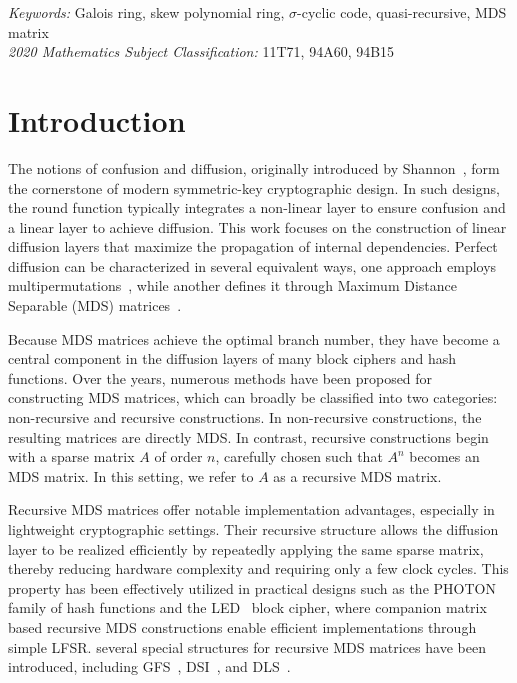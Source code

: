 \documentclass[11pt]{article}
\begin{document}
\noindent\textit{Keywords: }{Galois ring, skew polynomial ring, $\sigma$-cyclic code, quasi-recursive, MDS matrix}   \\
\textit{2020 Mathematics Subject Classification: }{11T71, 94A60, 94B15} 



\section{Introduction}
The notions of confusion and diffusion, originally introduced by Shannon~\cite{1949ShannonCommunication}, form the cornerstone of modern symmetric-key cryptographic design. In such designs, the round function typically integrates a non-linear layer to ensure confusion and a linear layer to achieve diffusion. This work focuses on the construction of linear diffusion layers that maximize the propagation of internal dependencies. Perfect diffusion can be characterized in several equivalent ways, one approach employs multipermutations~\cite{Vaudenay1995on}, while another defines it through Maximum Distance Separable (MDS) matrices~\cite{Daemen2002the}.

Because MDS matrices achieve the optimal branch number, they have become a central component in the diffusion layers of many block ciphers and hash functions. Over the years, numerous methods have been proposed for constructing MDS matrices, which can broadly be classified into two categories: non-recursive and recursive constructions. In non-recursive constructions, the resulting matrices are directly MDS. In contrast, recursive constructions begin with a sparse matrix $A$ of order $n$, carefully chosen such that $A^n$ becomes an MDS matrix. In this setting, we refer to $A$ as a recursive MDS matrix.

Recursive MDS matrices offer notable implementation advantages, especially in lightweight cryptographic settings. Their recursive structure allows the diffusion layer to be realized efficiently by repeatedly applying the same sparse matrix, thereby reducing hardware complexity and requiring only a few clock cycles. This property has been effectively utilized in practical designs such as the \textsc{PHOTON}~\cite{Guo2011the} family of hash functions and the \textsc{LED}~\cite{Guo2011TheLED} block cipher, where companion matrix based recursive MDS constructions enable efficient implementations through simple LFSR. several special structures for recursive MDS matrices have been introduced, including GFS~\cite{Recursive_Diffusion_Layer12}, DSI~\cite{DSI}, and DLS~\cite{Rec_MDS_2022}.
\end{document}

